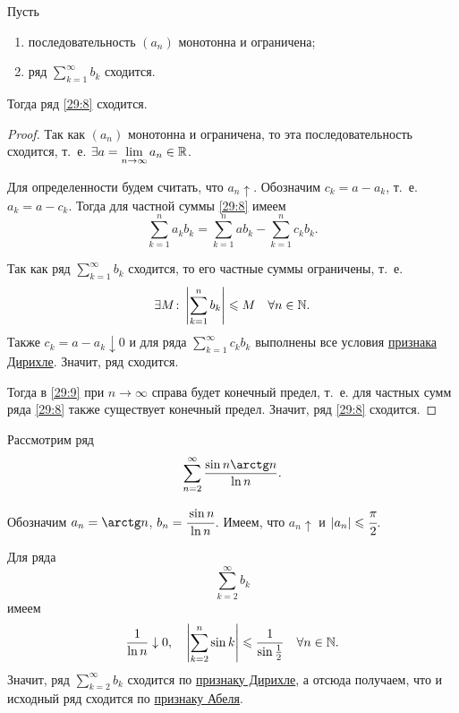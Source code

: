 \documentclass[../../main.tex]{subfiles}
\begin{document}
	\begin{thm}
		\label{29:abel}
		Пусть
		\begin{enumerate}
			\item последовательность $(a_n)$ монотонна и ограничена;
			\item ряд $\sum\limits_{k = 1}^\infty b_k$ сходится.
		\end{enumerate}
	
		Тогда ряд \eqref{29:8} сходится.
	\end{thm}
	\begin{proof}
		Так как $(a_n)$ монотонна и ограничена, то эта последовательность сходится, 
		т.~е. $\exists a = 
		\lim\limits_{n\to\infty} a_n\in \R$.
		
		Для определенности будем считать, что $a_n\uparrow$.
		Обозначим $c_k = a - a_k$, т.~е. $a_k = a - c_k$. 
		Тогда для частной суммы \eqref{29:8} имеем
		\begin{equation}
			\sum_{k = 1}^n a_kb_k = \sum_{k = 1}^n ab_k - \sum_{k = 1}^n c_kb_k.
			\label{29:9}
		\end{equation}
		
		Так как ряд $\sum\limits_{k = 1}^\infty b_k$ сходится, 
		то его частные суммы ограничены, т.~е. 
		\[\exists M\colon \left|\sum\limits_{k = 1}^n b_k\right|\leq M \quad
		\forall n \in \N.\]
		Также $c_k = a - a_k \downarrow 0$ и для ряда
		$\sum\limits_{k = 1}^\infty c_kb_k$
		выполнены все условия \hyperref[29:dirichle]{признака Дирихле}. 
		Значит, ряд сходится.
		
		Тогда в \eqref{29:9} при $n\to\infty$ 
		справа будет конечный предел, т.~е. для частных сумм ряда \eqref{29:8} также 
		существует конечный предел. Значит, ряд \eqref{29:8} сходится.
	\end{proof}
	\begin{example}
		Рассмотрим ряд
		\[\sum_{n = 2}^\infty\frac{\sin n\arctg n}{\ln n}.\]
		
		Обозначим $a_n = \arctg n$, $b_n = \cfrac{\sin n}{\ln n}$. 
		Имеем, что $a_n\uparrow$ и $|a_n|\leq \cfrac{\pi}{2}$.
		
		Для ряда \[\sum_{k = 2}^\infty b_k\] 
		имеем
		\[\frac{1}{\ln n}\downarrow0,\quad \left|\sum_{k = 2}^n \sin k\right|
		\leq \frac{1}{\sin\frac{1}{2}} \quad\forall n \in \N.\]
		Значит, ряд $\sum\limits_{k = 2}^\infty b_k$ сходится по 
		\hyperref[29:dirichle]{признаку Дирихле}, а отсюда получаем, 
		что и исходный ряд сходится по \hyperref[29:abel]{признаку Абеля}.
	\end{example}
\end{document}
